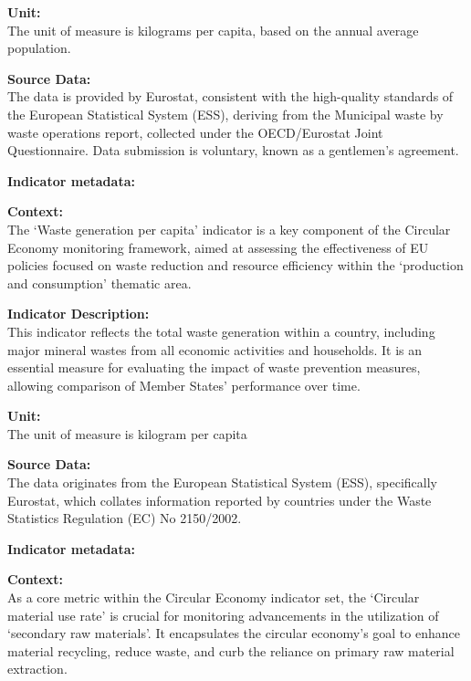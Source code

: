 {\large\textbf{Unit:}}  \\ \indent
The unit of measure is kilograms per capita, based on the annual average population.

{\large\textbf{Source Data:}}  \\ \indent
The data is provided by Eurostat, consistent with the high-quality standards of the European Statistical System (ESS), deriving from the Municipal waste by waste operations report, collected under the OECD/Eurostat Joint Questionnaire. Data submission is voluntary, known as a gentlemen's agreement.

\textbf{Indicator metadata:}   \href{https://ec.europa.eu/eurostat/cache/metadata/en/cei_pc034_esmsip2.htm}{\faExternalLink}

{\large\textbf{Context:}}  \\ \indent
The `Waste generation per capita' indicator is a key component of the Circular Economy monitoring framework, aimed at assessing the effectiveness of EU policies focused on waste reduction and resource efficiency within the `production and consumption' thematic area.

{\large\textbf{Indicator Description:}}  \\ \indent
This indicator reflects the total waste generation within a country, including major mineral wastes from all economic activities and households. It is an essential measure for evaluating the impact of waste prevention measures, allowing comparison of Member States' performance over time.

{\large\textbf{Unit:}}  \\ \indent
The unit of measure is kilogram per capita

{\large\textbf{Source Data:}}  \\ \indent
The data originates from the European Statistical System (ESS), specifically Eurostat, which collates information reported by countries under the Waste Statistics Regulation (EC) No 2150/2002.

\textbf{Indicator metadata:}   \href{https://ec.europa.eu/eurostat/cache/metadata/en/cei_srm030_esmsip2.htm}{\faExternalLink}

{\large\textbf{Context:}}  \\ \indent
As a core metric within the Circular Economy indicator set, the `Circular material use rate' is crucial for monitoring advancements in the utilization of `secondary raw materials'. It encapsulates the circular economy's goal to enhance material recycling, reduce waste, and curb the reliance on primary raw material extraction.

